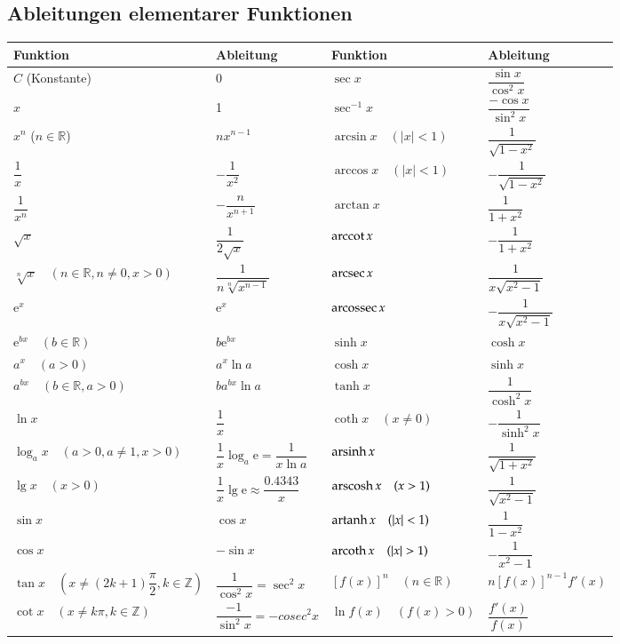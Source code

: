 \subsection{Ableitungen elementarer Funktionen}
\renewcommand{\arraystretch}{2.2}
\begin{tabular}{|l|l||l|l|}
	\hline
	\textbf{Funktion} & \textbf{Ableitung} & \textbf{Funktion} &
	\textbf{Ableitung}\\\hline
	\hline $C$ (Konstante) & 0 & $\sec x$ & $\dfrac{\sin x}{\cos^2 x}$ \\
	\hline $x$ & 1 & $\sec^{-1} x$ & $\dfrac{-\cos x}{\sin^2 x}$\\
	\hline $x^n$ ($n\in\mathbb{R}$) & $nx^{n-1}$ & $\arcsin x \quad (|x| < 1)$ &
	 $\dfrac{1}{\sqrt{1-x^2}}$\\
	\hline $\dfrac{1}{x}$ & $-\dfrac{1}{x^2}$ & $\arccos x \quad (|x| < 1)$ &
	$-\dfrac{1}{\sqrt{1-x^2}}$\\
	\hline $\dfrac{1}{x^n}$ & $-\dfrac{n}{x^{n+1}}$ & $\arctan x$ & $\dfrac{1}{1+x^2}$\\
	\hline $\sqrt{x}$ & $\dfrac{1}{2\sqrt{x}}$ & $\operatorname{arccot}{x} $ & $-\dfrac{1}{1+x^2}$\\
	\hline $\sqrt[n]{x}\quad (n\in\mathbb{R}, n \neq 0, x > 0)$ &
	$\dfrac{1}{n\sqrt[n]{x^{n-1}}}$ & $\operatorname{arcsec} x$ & $\dfrac{1}{x\sqrt{x^2-1}}$\\
	\hline $\mathrm{e}^x$ & $\mathrm{e}^x$ & $\operatorname{arcossec} x$ & $-\dfrac{1}{x\sqrt{x^2-1}}$\\
	\hline $\mathrm{e}^{bx}\quad (b\in\mathbb{R})$ & $b\mathrm{e}^{bx}$ & $\sinh x$ &
	$\cosh x$\\
	\hline $a^x\quad (a > 0)$ & $a^x\ln a$ & $\cosh x$ & $\sinh x$\\
	\hline $a^{bx}\quad (b\in\mathbb{R}, a > 0)$ & $ba^{bx}\ln a$ & $\tanh x$ &
	$\dfrac{1}{\cosh^2 x}$\\
	\hline $\ln x$ & $\dfrac{1}{x}$ & $\coth x \quad(x \neq 0)$ & $-\dfrac{1}{\sinh^2 x}$\\
	\hline $\log_a{x} \quad (a > 0, a \neq 1, x > 0)$ &
	$\dfrac{1}{x}\log_a{\mathrm{e}}=\dfrac{1}{x\ln a}$ & $\operatorname{arsinh} x$ &
	$\dfrac{1}{\sqrt{1+x^2}}$\\
	\hline $\lg x \quad (x > 0)$ & $\dfrac{1}{x}\lg \mathrm{e}\approx \dfrac{0.4343}{x}$
	& $\operatorname{arscosh} x \quad (x > 1)$ & $\dfrac{1}{\sqrt{x^2-1}}$\\
	\hline $\sin x$ & $\cos x$ & $\operatorname{artanh} x \quad (|x| < 1)$ & $\dfrac{1}{1-x^2}$\\
	\hline $\cos x$ & $-\sin x$ & $\operatorname{arcoth} x \quad (|x| > 1)$ & $-\dfrac{1}{x^2-1}$\\
	\hline $\tan x \quad (x\neq(2k+1)\dfrac{\pi}{2}, k\in\mathbb{Z})$ & $\dfrac{1}{\cos^2
		x}=\sec^2 x$ & $[f(x)]^n \quad (n\in\mathbb{R})$ & $n[f(x)]^{n-1}f'(x)$\\
	\hline $\cot x \quad (x\neq k\pi, k\in\mathbb{Z})$ & $\dfrac{-1}{\sin^2 x}=-cosec^2x$ & $\ln f(x) \quad (f(x)> 0)$ & $\dfrac{f'(x)}{f(x)}$\\
	\hline
\end{tabular}
\clearpage
\pagebreak